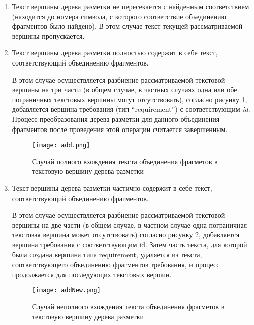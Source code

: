 \begin{enumerate}

\item Текст вершины дерева разметки не пересекается с найденным соответствием (находится до номера символа, с которого соответствие объединению фрагментов было найдено). В этом случае текст текущей рассматриваемой вершины пропускается.

\item Текст вершины дерева разметки полностью содержит в себе текст, соответствующий объединению фрагментов.

В этом случае осуществляется разбиение рассматриваемой текстовой вершины на три части (в общем случае, в частных случаях одна или обе пограничных текстовых вершины могут отсутствовать), согласно рисунку \ref{sys:add}, добавляется вершина требования (тип “requirement”) с соответствующим \emph{id}. Процесс преобразования дерева разметки для данного объединения фрагментов после проведения этой операции считается завершенным.

\begin{figure}[h]
\begin{center}
\texttt{[image: add.png]}
\caption{Случай полного вхождения текста объединения фрагметов в текстовую вершину дерева разметки}
\label{sys:add}
\end{center}
\end{figure}

\item Текст вершины дерева разметки частично содержит в себе текст, соответствующий объединению фрагментов. 

В этом случае осуществляется разбиение рассматриваемой текстовой вершины на две части (в общем случае, в частном случае одна пограничная текстовая вершина может отсутствовать) согласно рисунку \ref{sys:addNew}, добавляется вершина требования с соответствующим id. Затем часть текста, для которой была создана вершина типа requirement, удаляется из текста, соответствующего объединению фрагментов требования, и процесс продолжается для последующих текстовых вершин.

\begin{figure}[h]
\begin{center}
\texttt{[image: addNew.png]}
\caption{Случай неполного вхождения текста объединения фрагметов в текстовую вершину дерева разметки}
\label{sys:addNew}
\end{center}
\end{figure}

\end{enumerate}

